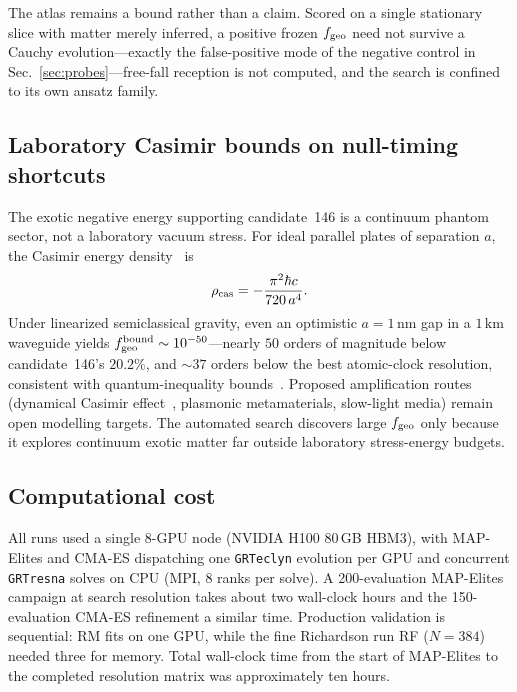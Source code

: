 \documentclass[twocolumn,floatfix,aps,prd,nofootinbib]{revtex4-2}
\begin{document}
The atlas remains a bound rather than a claim. Scored on a single stationary
slice with matter merely inferred, a positive frozen $f_{\rm geo}$ need not
survive a Cauchy evolution---exactly the false-positive mode of the negative
control in Sec.~\ref{sec:probes}---free-fall reception is not computed, and the
search is confined to its own ansatz family.

\subsection{Laboratory Casimir bounds on null-timing shortcuts}
\label{sec:casimir_bounds}

The exotic negative energy supporting candidate~146 is a continuum phantom
sector, not a laboratory vacuum stress. For ideal parallel plates of
separation $a$, the Casimir energy density~\cite{casimir1948} is
\begin{equation}
  \rho_{\rm cas}
  = -\frac{\pi^2\hbar c}{720\,a^4}.
  \label{eq:casimir_rho}
\end{equation}
Under linearized semiclassical gravity, even an optimistic
$a=1\,\mathrm{nm}$ gap in a $1\,\mathrm{km}$ waveguide yields
$f_{\rm geo}^{\rm bound}\sim10^{-50}$---nearly $50$ orders of magnitude
below candidate~146's $20.2\%$, and ${\sim}37$ orders below the best
atomic-clock resolution, consistent with quantum-inequality
bounds~\cite{fordroman95}. Proposed amplification routes (dynamical
Casimir effect~\cite{wilson2011dce}, plasmonic metamaterials, slow-light
media) remain open modelling targets. The automated search discovers large
$f_{\rm geo}$ only because it explores continuum exotic matter far outside
laboratory stress-energy budgets.

\subsection{Computational cost}

All runs used a single 8-GPU node (NVIDIA H100 80\,GB HBM3), with MAP-Elites
and CMA-ES dispatching one \texttt{GRTeclyn} evolution per GPU and concurrent
\texttt{GRTresna} solves on CPU (MPI, 8 ranks per solve). A 200-evaluation
MAP-Elites campaign at search resolution takes about two wall-clock hours and
the 150-evaluation CMA-ES refinement a similar time. Production validation is
sequential: RM fits on one GPU, while the fine Richardson run RF ($N=384$)
needed three for memory. Total wall-clock time from the start of MAP-Elites to
the completed resolution matrix was approximately ten hours.
\end{document}
